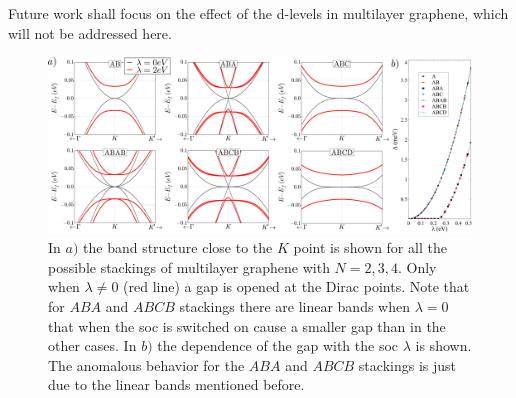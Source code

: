 Future work shall focus on the effect of the d-levels in multilayer graphene, which will not be addressed here.

\begin{figure}
\begin{minipage}{.9\linewidth}
\begin{center}
 \includegraphics[width=\textwidth]{appendix/fig_qsh/bands.png}
\end{center}
\end{minipage}
\caption{ In $a)$ the band structure close to the $K$ point is shown for all the possible stackings of multilayer graphene with $N = {2,3,4}$. Only when $\lambda \neq 0$ (red line) a gap is opened at the Dirac points.
Note that for $ABA$ and $ABCB$ stackings there are linear bands when $\lambda=0$ that when the \ac{soc} is switched on cause a smaller gap than in the other cases.
In $b)$ the dependence of the gap with the \ac{soc} $\lambda$ is shown. The anomalous behavior for the $ABA$ and $ABCB$ stackings is just due to the linear bands mentioned before.}
\label{Bilayer}
\end{figure}

